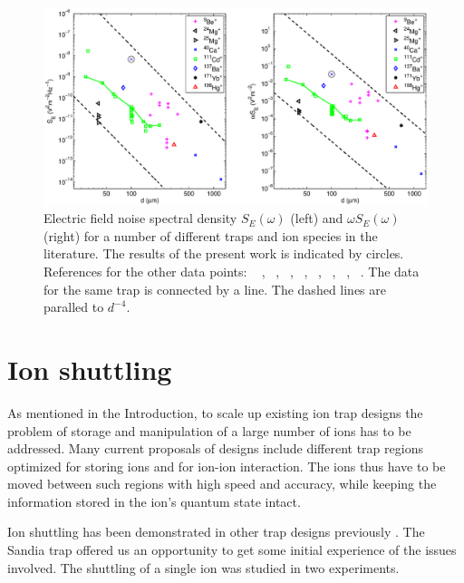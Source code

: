 \begin{figure}[h!t]
\centering
\includegraphics[width=15.5cm]{chapter7/heating/noise_spectra_v3}
\caption[Electric field noise spectral density]{Electric field noise spectral density $S_E(\omega)$ (left) and $\omega S_E(\omega)$ (right) for a number of different traps and ion species in the literature. The results of the present work is indicated by circles. References for the other data points: ~\cite{Rowe2002,Monroe1995,Turchette2000} , ~\cite{Seidelin2006}, ~\cite{Epstein2007}, ~\cite{Roos1999,Home2006b}, ~\cite{Deslauriers2004,Stick2006,Deslauriers2006}, ~\cite{DeVoe2002}, ~\cite{Tamm2000}, ~\cite{Diedrich1989}. The data for the same trap is connected by a line. The dashed lines are paralled to $d^{-4}$. \cversion}
\label{fig:noise_spectra}
\end{figure} 



\section{Ion shuttling}
\label{sec:ionshuttle}
As mentioned in the Introduction, to scale up existing ion trap designs the problem of storage and manipulation of a large number of ions has to be addressed. Many current proposals of designs include different trap regions optimized for storing ions and for ion-ion interaction. The ions thus have to be moved between such regions with high speed and accuracy, while keeping the information stored in the ion's quantum state intact.

Ion shuttling has been demonstrated in other trap designs previously \cite{Huber2008}. The Sandia trap offered us an opportunity to get some initial experience of the issues involved. The shuttling of a single ion was studied in two experiments. 

